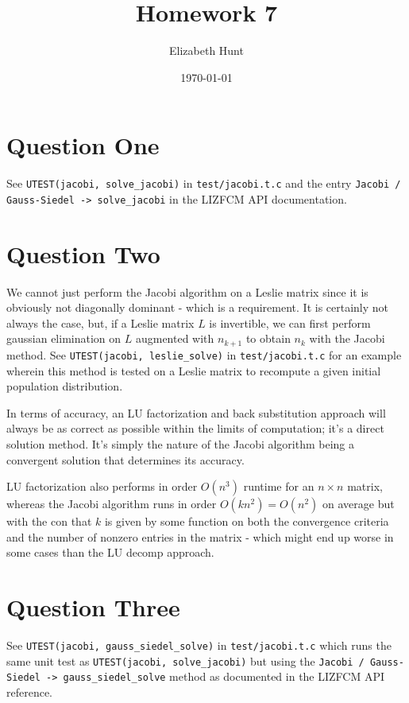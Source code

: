 \documentclass[11pt]{article}
\author{Elizabeth Hunt}
\date{\today}
\title{Homework 7}
\begin{document}
\maketitle
\setlength\parindent{0pt}

\section{Question One}
\label{sec:orgb6d5cda}
See \texttt{UTEST(jacobi, solve\_jacobi)} in \texttt{test/jacobi.t.c} and the entry
\texttt{Jacobi / Gauss-Siedel -> solve\_jacobi} in the LIZFCM API documentation.
\section{Question Two}
\label{sec:org9786314}
We cannot just perform the Jacobi algorithm on a Leslie matrix since
it is obviously not diagonally dominant - which is a requirement. It is
certainly not always the case, but, if a Leslie matrix \(L\) is invertible, we can
first perform gaussian elimination on \(L\) augmented with \(n_{k+1}\)
to obtain \(n_k\) with the Jacobi method. See \texttt{UTEST(jacobi, leslie\_solve)}
in \texttt{test/jacobi.t.c} for an example wherein this method is tested on a Leslie
matrix to recompute a given initial population distribution.

In terms of accuracy, an LU factorization and back substitution approach will
always be as correct as possible within the limits of computation; it's a
direct solution method. It's simply the nature of the Jacobi algorithm being
a convergent solution that determines its accuracy.

LU factorization also performs in order \(O(n^3)\) runtime for an \(n \times n\)
matrix, whereas the Jacobi algorithm runs in order \(O(k n^2) = O(n^2)\) on average
but with the con that \(k\) is given by some function on both the convergence criteria and the number of
nonzero entries in the matrix - which might end up worse in some cases than the LU decomp approach.

\section{Question Three}
\label{sec:org0ea87d0}
See \texttt{UTEST(jacobi, gauss\_siedel\_solve)} in \texttt{test/jacobi.t.c} which runs the same
unit test as \texttt{UTEST(jacobi, solve\_jacobi)} but using the
\texttt{Jacobi / Gauss-Siedel -> gauss\_siedel\_solve} method as documented in the LIZFCM API reference.
\end{document}
